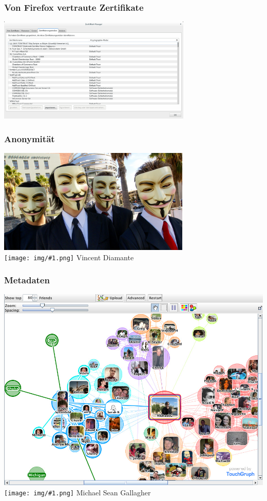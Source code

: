 \documentclass[12pt]{beamer}
\newcommand{\cc}[1]{\texttt{[image: img/\#1.png]}\hspace{1mm}}
\begin{document}
\begin{frame}
    \frametitle{Von Firefox vertraute Zertifikate}
    \begin{center}
      \includegraphics[height=5cm]{img/zertifikate.png}
    \end{center}
\end{frame}

\begin{frame}
    \frametitle{Anonymität}
    \begin{center}
      \includegraphics[height=5cm]{img/anonymous.jpg}
      \\{\small \cc{by-sa} Vincent Diamante}
    \end{center}
\end{frame}

\begin{frame}
    \frametitle{Metadaten}
    \includegraphics[height=0.7\textheight]{img/socialgraph.jpg}
    \\{\small \cc{by-sa} Michael Sean Gallagher}
\end{frame}
\end{document}

